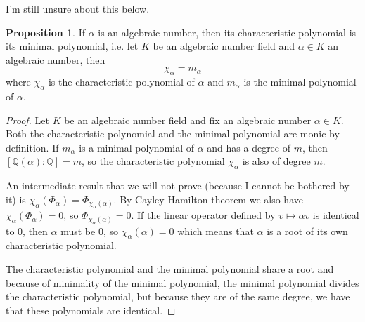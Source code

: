 \documentclass[a4paper]{book}
\theoremstyle{definition}
\newtheorem{proposition}[definition]{Proposition}
\begin{document}
I'm still unsure about this below.
\begin{thmbox}
    \begin{proposition}
        If \(\alpha\) is an algebraic number, then its characteristic polynomial is its minimal polynomial, i.e. let \(K\) be an algebraic number field and \(\alpha \in K\) an algebraic number, then
        \begin{equation*}
            \chi_\alpha = m_\alpha
        \end{equation*}
        where \(\chi_\alpha\) is the characteristic polynomial of \(\alpha\) and \(m_\alpha\) is the minimal polynomial of \(\alpha\).
    \end{proposition}
\end{thmbox}
\begin{proof}
    Let \(K\) be an algebraic number field and fix an algebraic number \(\alpha \in K\). Both the characteristic polynomial and the minimal polynomial are monic by definition. If \(m_\alpha\) is a minimal polynomial of \(\alpha\) and has a degree of \(m\), then \([\mathbb{Q}(\alpha) : \mathbb{Q}] = m\), so the characteristic polynomial \(\chi_\alpha\) is also of degree \(m\).

    An intermediate result that we will not prove (because I cannot be bothered by it) is \(\chi_\alpha(\Phi_\alpha) = \Phi_{\chi_\alpha(\alpha)}\). By Cayley-Hamilton theorem we also have \(\chi_\alpha(\Phi_\alpha) = 0\), so \(\Phi_{\chi_\alpha(\alpha)} = 0\). If the linear operator defined by \(v \mapsto \alpha v\) is identical to \(0\), then \(\alpha\) must be \(0\), so \(\chi_\alpha(\alpha) = 0\) which means that \(\alpha\) is a root of its own characteristic polynomial.

    The characteristic polynomial and the minimal polynomial share a root and because of minimality of the minimal polynomial, the minimal polynomial divides the characteristic polynomial, but because they are of the same degree, we have that these polynomials are identical.
\end{proof}
\end{document}
